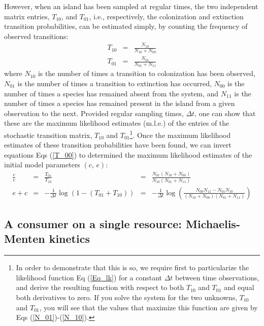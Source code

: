 However, when an island has been sampled at regular times, the two independent matrix entries, $T_{10}$, and $T_{01}$, i.e., respectively, the colonization and extinction transition probabilities, can be estimated simply, by counting the frequency of observed transitions: 
\begin{eqnarray}
\label{N_10}
T_{10} & = & \frac{N_{10}}{N_{10} + N_{00}} \\
\label{N_01}
T_{01} & = & \frac{N_{01}}{N_{01} + N_{11}}
\end{eqnarray}
where $N_{10}$ is the number of times a transition to colonization has been observed, $N_{01}$ is the number of times a transition to extinction has occurred, $N_{00}$ is the number of times a species has remained absent from the system, and $N_{11}$ is the number of times a species has remained present in the island from a given observation to the next. Provided regular sampling times, $\Delta t$,  one can show that these are the maximum likelihood estimates (m.l.e.) of the entries of the stochastic transition matrix, $T_{10}$ and $T_{01}$\footnote{In order to demonstrate that this is so, we require first to particularize the likelihood function Eq (\ref{Eq_lk}) for a constant $\Delta t$ between time observations, and derive the resulting function with respect to both $T_{10}$ and $T_{01}$ and equal both derivatives to zero. If you solve the system for the two unknowns, $T_{10}$ and $T_{01}$, you will see that the values that maximize this function are given by Eqs (\ref{N_01})-(\ref{N_10}).}. Once the maximum likelihood estimates of these transition probabilities have been found, we can invert equations Eqs (\ref{T_00}) to determined the maximum likelihood estimates of the initial model parameters $(c,\, e)$:
\begin{equation}
\begin{array}{ccccc}
\frac{e}{c} &=& \frac{T_{01}}{T_{10}}           &=&      \frac{N_{01}(N_{10}+N_{00})}{N_{10}(N_{01}+N_{11})}\\
e + c       &=& -\frac{1}{\Delta t}\log(1 - (T_{01}+T_{10})) &=& -\frac{1}{\Delta t}\log\left(\frac{N_{00}N_{11}-N_{01}N_{10}}{(N_{10}+N_{00})(N_{01}+N_{11})}\right)
\end{array}
\end{equation}

\subsection{A consumer on a single resource: Michaelis-Menten kinetics}
\label{MMkin}

